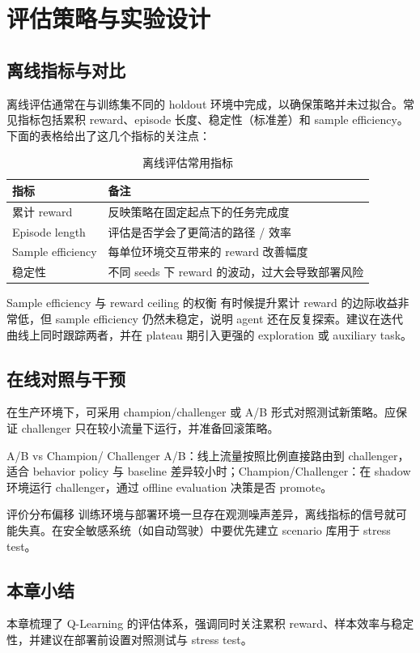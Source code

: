 \section{评估策略与实验设计}

\subsection{离线指标与对比}

离线评估通常在与训练集不同的 holdout 环境中完成，以确保策略并未过拟合。常见指标包括累积 reward、episode 长度、稳定性（标准差）和 sample efficiency。下面的表格给出了这几个指标的关注点：

\begin{table}[H]
\centering
\begin{tabular}{lp{8cm}}
\toprule
指标 & 备注 \\
\midrule
累计 reward & 反映策略在固定起点下的任务完成度 \\
Episode length & 评估是否学会了更简洁的路径 / 效率 \\
Sample efficiency & 每单位环境交互带来的 reward 改善幅度 \\
稳定性 & 不同 seeds 下 reward 的波动，过大会导致部署风险 \\
\bottomrule
\end{tabular}
\caption{离线评估常用指标}
\end{table}

\begin{importantbox}{Sample efficiency 与 reward ceiling 的权衡}
有时候提升累计 reward 的边际收益非常低，但 sample efficiency 仍然未稳定，说明 agent 还在反复探索。建议在迭代曲线上同时跟踪两者，并在 plateau 期引入更强的 exploration 或 auxiliary task。
\end{importantbox}

\subsection{在线对照与干预}

在生产环境下，可采用 champion/challenger 或 A/B 形式对照测试新策略。应保证 challenger 只在较小流量下运行，并准备回滚策略。

\begin{knowledgebox}{A/B vs Champion/ Challenger}
A/B：线上流量按照比例直接路由到 challenger，适合 behavior policy 与 baseline 差异较小时；Champion/Challenger：在 shadow 环境运行 challenger，通过 offline evaluation 决策是否 promote。
\end{knowledgebox}

\begin{warningbox}{评价分布偏移}
训练环境与部署环境一旦存在观测噪声差异，离线指标的信号就可能失真。在安全敏感系统（如自动驾驶）中要优先建立 scenario 库用于 stress test。
\end{warningbox}

\subsection{本章小结}

本章梳理了 Q-Learning 的评估体系，强调同时关注累积 reward、样本效率与稳定性，并建议在部署前设置对照测试与 stress test。

